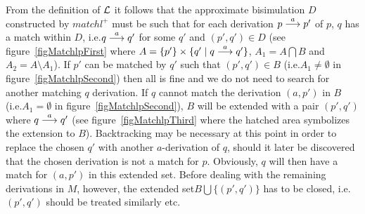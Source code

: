 From the definition of $\cal L$ it follows that the approximate bisimulation $D$ constructed by $matchl^{+}$ must be such that for each derivation $p\stackrel{a}{\longrightarrow}p'$ of $p$, $q$ has a match within $D$, i.e.\@ $q\stackrel{a}{\longrightarrow}q'$ for some $q'$ and $(p',q')\in D$ (see figure~\ref{figMatchlpFirst} where $A = \{p'\}\times\{q'\mid q\stackrel{a}{\longrightarrow}q'\}$, $A_1=A\bigcap B$ and $A_2=A\setminus A_1$). If $p'$ can be matched by $q'$ such that $(p',q')\in B$ (i.e.\@ $A_1\not=\emptyset$ in figure~\ref{figMatchlpSecond}) then all is fine and we do not need to search for another matching $q$ derivation. If $q$ cannot match the derivation $(a,p')$ in $B$ (i.e.\@ $A_1=\emptyset$ in figure~\ref{figMatchlpSecond}), $B$ will be extended with a pair $(p',q')$ where $q\stackrel{a}{\longrightarrow}q'$ (see figure~\ref{figMatchlpThird} where the hatched area symbolizes the extension to $B$). Backtracking may be necessary at this point in order to replace the chosen $q'$ with another $a$-derivation of $q$, should it later be discovered that the chosen derivation is not a match for $p$. Obviously, $q$ will then have a match for $(a,p')$ in this extended set. Before dealing with the remaining derivations in $M$, however, the extended set$B\bigcup\{(p',q')\}$ has to be closed, i.e.\@ $(p',q')$ should be treated similarly etc.

